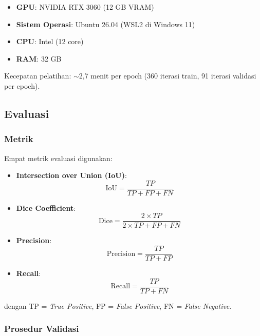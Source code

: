 \documentclass[12pt,a4paper]{article}
\begin{document}
\begin{itemize}[nosep]
    \item \textbf{GPU}: NVIDIA RTX 3060 (12 GB VRAM)
    \item \textbf{Sistem Operasi}: Ubuntu 26.04 (WSL2 di Windows 11)
    \item \textbf{CPU}: Intel (12 core)
    \item \textbf{RAM}: 32 GB
\end{itemize}

Kecepatan pelatihan: $\sim$2,7 menit per epoch (360 iterasi train, 
91 iterasi validasi per epoch).

\subsection{Evaluasi}

\subsubsection{Metrik}

Empat metrik evaluasi digunakan:

\begin{itemize}[nosep]
    \item \textbf{Intersection over Union (IoU)}:
    \begin{equation}
        \text{IoU} = \frac{TP}{TP + FP + FN}
    \end{equation}
    
    \item \textbf{Dice Coefficient}:
    \begin{equation}
        \text{Dice} = \frac{2 \times TP}{2 \times TP + FP + FN}
    \end{equation}
    
    \item \textbf{Precision}:
    \begin{equation}
        \text{Precision} = \frac{TP}{TP + FP}
    \end{equation}
    
    \item \textbf{Recall}:
    \begin{equation}
        \text{Recall} = \frac{TP}{TP + FN}
    \end{equation}
\end{itemize}

dengan TP = \textit{True Positive}, FP = \textit{False Positive}, 
FN = \textit{False Negative}.

\subsubsection{Prosedur Validasi}
\end{document}
